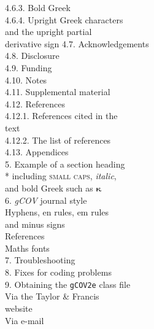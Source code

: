 \documentclass{gCOV2e}
\theoremstyle{plain}%
\theoremstyle{definition}
\theoremstyle{remark}
\begin{document}
{{{\hspace*{24pt} {4.6.3.}  Bold Greek\\
\hspace*{24pt} {4.6.4.}  Upright Greek characters \\
\hspace*{47pt}            and the upright partial \\
\hspace*{47pt}            derivative sign }
\hspace{-24pt}\vbox{\noindent{}
\hspace*{7pt} {4.7.}   Acknowledgements \\
\hspace*{7pt} {4.8.}   Disclosure \\
\hspace*{7pt} {4.9.}   Funding \\
\hspace*{7pt} {4.10.}   Notes \\
\hspace*{7pt} {4.11.}   Supplemental material \\
\hspace*{7pt} {4.12.}   References \\
\hspace*{24pt} {4.12.1.}  References cited in the \\
\hspace*{52pt}            text\\
\hspace*{24pt} {4.12.2.}  The list of references\\
\hspace*{7pt} {4.13.}   Appendices \\
{5.}    Example of a section heading \\*
\hspace*{6pt}   including {\scshape{small caps}}, \textit{italic}, \\
\hspace*{6pt}   and bold Greek such as ${\bm\kappa}$ \\
{6.}    \textit{gCOV} journal style \\
\hspace*{10pt}{6.1.}   Hyphens, en rules, em rules \\ \hspace*{27pt}and minus signs\\
\hspace*{10pt}{6.2.}   References \\
\hspace*{10pt}{6.3.}   Maths fonts\\
{7.}    Troubleshooting\\
{8.}    Fixes for coding problems\\
{9.}    Obtaining the \texttt{gCOV2e} class file\\
\hspace*{10pt}{9.1}  Via the Taylor \& Francis \\
\hspace*{24pt}       website\\
\hspace*{10pt}{9.2}  Via e-mail\\}}}
\end{document}
